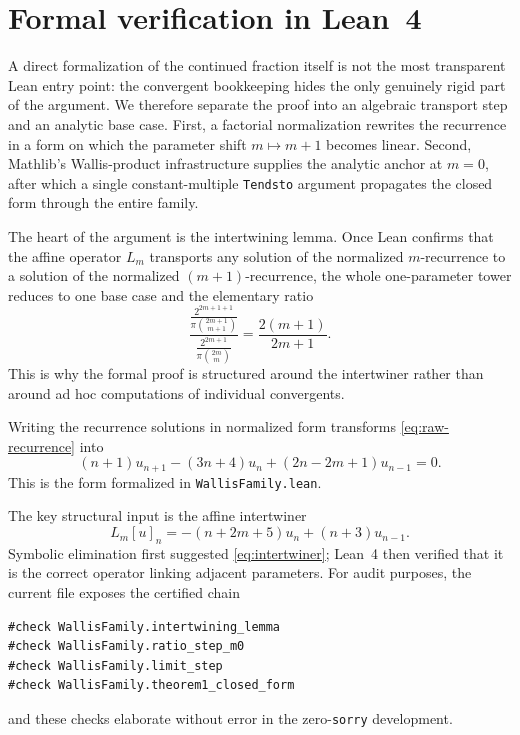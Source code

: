 \documentclass[11pt,reqno]{amsart}
\newcommand{\WallisValue}[1]{\frac{2^{2#1+1}}{\pi\binom{2#1}{#1}}}
\theoremstyle{plain}
\theoremstyle{definition}
\theoremstyle{remark}
\begin{document}
\section{Formal verification in Lean~4}\label{sec:lean}

A direct formalization of the continued fraction itself is not the most transparent Lean entry point: the convergent bookkeeping hides the only genuinely rigid part of the argument.  We therefore separate the proof into an algebraic transport step and an analytic base case.  First, a factorial normalization rewrites the recurrence in a form on which the parameter shift $m \mapsto m+1$ becomes linear.  Second, Mathlib's Wallis-product infrastructure \cite{mathlib2020,borwein1987pi} supplies the analytic anchor at $m=0$, after which a single constant-multiple \texttt{Tendsto} argument propagates the closed form through the entire family.

The heart of the argument is the intertwining lemma.  Once Lean confirms that the affine operator $L_m$ transports any solution of the normalized $m$-recurrence to a solution of the normalized $(m+1)$-recurrence, the whole one-parameter tower reduces to one base case and the elementary ratio
\[
  \frac{\WallisValue{m+1}}{\WallisValue{m}} = \frac{2(m+1)}{2m+1}.
\]
This is why the formal proof is structured around the intertwiner rather than around ad hoc computations of individual convergents.

Writing the recurrence solutions in normalized form transforms \eqref{eq:raw-recurrence} into
\begin{equation}\label{eq:normalized-recurrence}
  (n+1)u_{n+1} - (3n+4)u_n + (2n-2m+1)u_{n-1} = 0.
\end{equation}
This is the form formalized in \texttt{WallisFamily.lean}.

The key structural input is the affine intertwiner
\begin{equation}\label{eq:intertwiner}
  L_m[u]_n = -(n+2m+5)u_n + (n+3)u_{n-1}.
\end{equation}
Symbolic elimination first suggested \eqref{eq:intertwiner}; Lean~4 then verified that it is the correct operator linking adjacent parameters.  For audit purposes, the current file exposes the certified chain
\begin{lstlisting}
#check WallisFamily.intertwining_lemma
#check WallisFamily.ratio_step_m0
#check WallisFamily.limit_step
#check WallisFamily.theorem1_closed_form
\end{lstlisting}
and these checks elaborate without error in the zero-\texttt{sorry} development.
\end{document}
